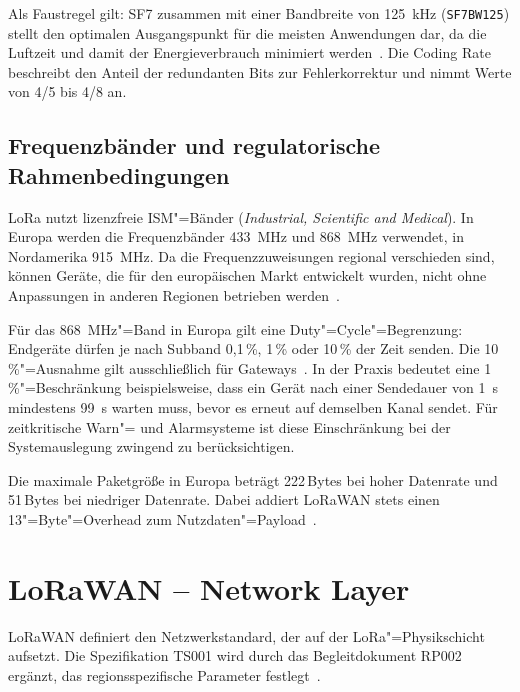 Als Faustregel gilt: SF7 zusammen mit einer Bandbreite von \SI{125}{\kHz}
(\texttt{SF7BW125}) stellt den optimalen Ausgangspunkt für die meisten Anwendungen
dar, da die Luftzeit und damit der Energieverbrauch minimiert werden~\cite{semtech_lora_basics}.
Die Coding Rate beschreibt den Anteil der redundanten Bits zur Fehlerkorrektur und
nimmt Werte von 4/5 bis 4/8 an.

\subsection{Frequenzbänder und regulatorische Rahmenbedingungen}
\label{subsec:frequenzbaender}

LoRa nutzt lizenzfreie ISM"=Bänder (\textit{Industrial, Scientific and Medical}).
In Europa werden die Frequenzbänder \SI{433}{\MHz} und \SI{868}{\MHz} verwendet,
in Nordamerika \SI{915}{\MHz}. Da die Frequenzzuweisungen regional verschieden sind,
können Geräte, die für den europäischen Markt entwickelt wurden, nicht ohne
Anpassungen in anderen Regionen betrieben werden~\cite{lorawan_spec}.

Für das \SI{868}{\MHz}"=Band in Europa gilt eine Duty"=Cycle"=Begrenzung: Endgeräte
dürfen je nach Subband 0{,}1\,\%, 1\,\% oder 10\,\% der Zeit senden. Die
10\,\%"=Ausnahme gilt ausschließlich für Gateways~\cite{lorawan_spec}. In der Praxis
bedeutet eine 1\,\%"=Beschränkung beispielsweise, dass ein Gerät nach einer
Sendedauer von \SI{1}{\s} mindestens \SI{99}{\s} warten muss, bevor es erneut auf
demselben Kanal sendet. Für zeitkritische Warn"= und Alarmsysteme ist diese
Einschränkung bei der Systemauslegung zwingend zu berücksichtigen.

Die maximale Paketgröße in Europa beträgt 222\,Bytes bei hoher Datenrate und
51\,Bytes bei niedriger Datenrate. Dabei addiert LoRaWAN stets einen
13"=Byte"=Overhead zum Nutzdaten"=Payload~\cite{lorawan_spec}.


\section{LoRaWAN -- Network Layer}
\label{sec:lorawan-network}

LoRaWAN definiert den Netzwerkstandard, der auf der LoRa"=Physikschicht aufsetzt.
Die Spezifikation TS001 wird durch das Begleitdokument RP002 ergänzt, das
regionsspezifische Parameter festlegt~\cite{lorawan_spec}.

